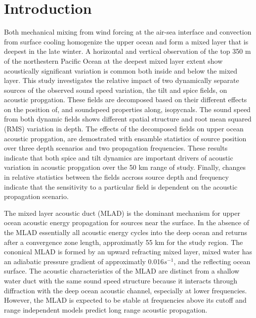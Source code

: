 \documentclass[preprint,NumberedRefs]{JASA}
\begin{document}
\section{\label{sec:intro} Introduction}
Both mechanical mixing from wind forcing at the air-sea interface and convection from surface cooling homogenize the upper ocean and form a mixed layer that is deepest in the late winter\citep{cole2010seasonal}. A horizontal and vertical observation of the top 350 m of the northestern Pacific Ocean at the deepest mixed layer extent show acoustically significant variation is common both inside and below the mixed layer\citep{colosi2020observations}. This study investigates the relative impact of two dynamically separate sources of the observed sound speed variation, the tilt and spice fields, on acoustic propgation. These fields are decomposed based on their different effects on the position of, and soundspeed properties along, isopycnals. The sound speed from both dynamic fields shows different spatial structure and root mean squared (RMS) variation in depth. The effects of the decomposed fields on upper ocean acoustic propgation, are demostrated with ensamble statistics of source position over three depth scenarios and two propagation frequencies. These results indicate that both spice and tilt dynamics are important drivers of acoustic variation in acoustic propgation over the 50 km range of study. Finally, changes in relative statistics between the fields accross source depth and frequency indicate that the sensitivity to a particular field is dependent on the acoustic propagation scenario.

The mixed layer acoustic duct (MLAD) is the dominant mechanism for upper ocean acoustic energy propagation for sources near the surface. In the absence of the MLAD essentially all acoustic energy cycles into the deep ocean and returns after a convergence zone length\cite{jensen2011computational}, approximatly 55 km for the study region. The cononical MLAD is formed by an upward refracting mixed layer, mixed water has an adiabatic pressure gradient of approximatly 0.016$s^{-1}$, and the reflecting ocean surface. The acoustic characteristics of the MLAD are distinct from a shallow water duct with the same sound speed structure because it interacts through diffraction with the deep ocean acoustic channel\citep{porter93}, especially at lower frequencies. However, the MLAD is expected to be stable at frequencies above its cutoff\citep{Urick1982Prop} and range independent models predict long range acoustic propagation.
\end{document}

